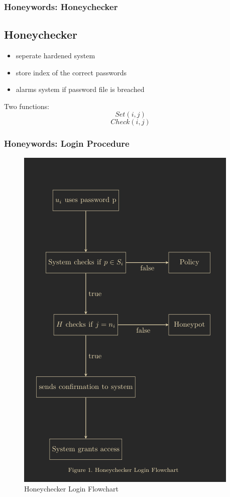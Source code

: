 \documentclass[9pt]{beamer}
\begin{document}
\begin{frame}
\frametitle{Honeywords: Honeychecker}
\subsection{Honeychecker}
	\begin{itemize}
		\item seperate hardened system
		\item store index of the correct passwords
		\item alarms system if password file is breached
	\end{itemize}

Two functions:
\[Set(i,j)\]
\[Check(i,j)\]
\end{frame}

\begin{frame}
\frametitle{Honeywords: Login Procedure}
  \begin{figure}
    \centering
    \includegraphics[height=0.8\textheight]{images/login.png}
    \caption{Honeychecker Login Flowchart}
    \label{fig:Figure1}
  \end{figure}
\end{frame}
\end{document}
